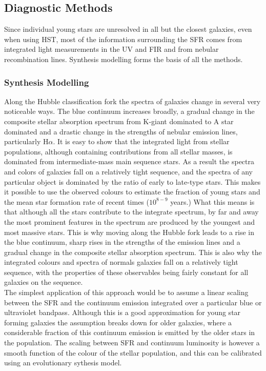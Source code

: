 \documentclass{literature}
\begin{document}
\subsection{Diagnostic Methods}
Since individual young stars are unresolved in all but the closest galaxies, even when using HST, most of the information surrounding the SFR comes from integrated light measurements in the UV and FIR and from nebular recombination lines. Synthesis modelling forms the basis of all the methods. 



\subsubsection{Synthesis Modelling}
Along the Hubble classification fork the spectra of galaxies change in several very noticeable ways. The blue continuum increases broadly, a gradual change in the composite stellar absorption spectrum from K-giant dominated to A star dominated and a drastic change in the strengths of nebular emission lines, particularly H$\alpha$. It is easy to show that the integrated light from stellar populations, although containing contributions from all stellar masses, is dominated from intermediate-mass main sequence stars. As a result the spectra and colors of galaxies fall on a relatively tight sequence, and the spectra of any particular object is dominated by the ratio of early to late-type stars. This makes it possible to use the observed colours to estimate the fraction of young stars and the mean star formation rate of recent times ($10^{8-9}$ years.) What this means is that although all the stars contribute to the integrate spectrum, by far and away the most prominent features in the spectrum are produced by the youngest and most massive stars. This is why moving along the Hubble fork leads to a rise in the blue continuum, sharp rises in the strengths of the emission lines and a gradual change in the composite stellar absorption spectrum. This is also why the integrated colours and spectra of normals galaxies fall on a relatively tight sequence, with the properties of these observables being fairly constant for all galaxies on the sequence. \\
The simplest application of this approach would be to assume a linear scaling between the SFR and the continuum emission integrated over a particular blue or ultraviolet bandpass. Although this is a good approximation for young star forming galaxies the assumption breaks down for older galaxies, where a considerable fraction of this continuum emission is emitted by the older stars in the population. The scaling between SFR and continuum luminosity is however a smooth function of the colour of the stellar population, and this can be calibrated using an evolutionary sythesis model. \\
\end{document}
